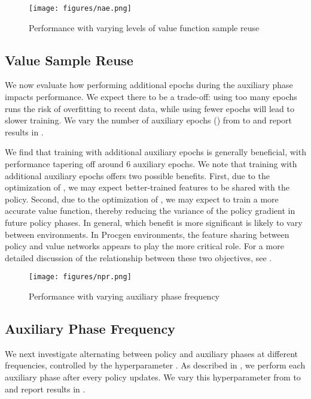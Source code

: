 \documentclass{article}
\begin{document}
\begin{figure*}
\centering
\texttt{[image: figures/nae.png]}
\caption{Performance with varying levels of value function sample reuse}
\label{fig:nae}
\end{figure*}

\subsection{Value Sample Reuse} \label{sec:value_sr}

We now evaluate how performing additional epochs during the auxiliary phase impacts performance. We expect there to be a trade-off: using too many epochs runs the risk of overfitting to recent data, while using fewer epochs will lead to slower training. We vary the number of auxiliary epochs () from  to  and report results in .

We find that training with additional auxiliary epochs is generally beneficial, with performance tapering off around 6 auxiliary epochs. We note that training with additional auxiliary epochs offers two possible benefits. First, due to the optimization of , we may expect better-trained features to be shared with the policy. Second, due to the optimization of , we may expect to train a more accurate value function, thereby reducing the variance of the policy gradient in future policy phases. In general, which benefit is more significant is likely to vary between environments. In Procgen environments, the feature sharing between policy and value networks appears to play the more critical role. For a more detailed discussion of the relationship between these two objectives, see .

\begin{figure*}
\centering
\texttt{[image: figures/npr.png]}
\caption{Performance with varying auxiliary phase frequency}
\label{fig:npr}
\end{figure*}

\subsection{Auxiliary Phase Frequency}

We next investigate alternating between policy and auxiliary phases at different frequencies, controlled by the hyperparameter . As described in , we perform each auxiliary phase after every  policy updates. We vary this hyperparameter from  to  and report results in .
\end{document}
